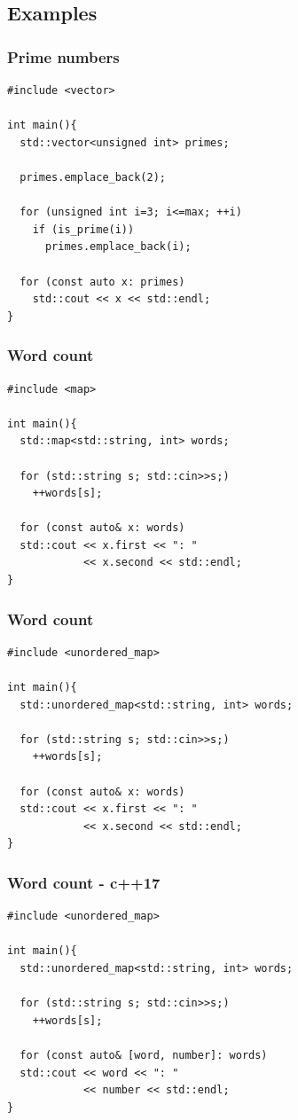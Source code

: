 \subsection{Examples}
\begin{frame}[fragile]
  \frametitle{Prime numbers}
\begin{lstlisting}
#include <vector>

int main(){
  std::vector<unsigned int> primes;
  
  primes.emplace_back(2);

  for (unsigned int i=3; i<=max; ++i)
    if (is_prime(i))
      primes.emplace_back(i);

  for (const auto x: primes)
    std::cout << x << std::endl;
}
\end{lstlisting}
\end{frame}

\begin{frame}[fragile]
  \frametitle{Word count}
\begin{lstlisting}
#include <map>
  
int main(){
  std::map<std::string, int> words;
  
  for (std::string s; std::cin>>s;)
    ++words[s];

  for (const auto& x: words)
  std::cout << x.first << ": "
            << x.second << std::endl;
}
\end{lstlisting}
\end{frame}

\begin{frame}[fragile]
  \frametitle{Word count}
\begin{lstlisting}
#include <unordered_map>
  
int main(){
  std::unordered_map<std::string, int> words;
  
  for (std::string s; std::cin>>s;)
    ++words[s];

  for (const auto& x: words)
  std::cout << x.first << ": "
            << x.second << std::endl;
}
\end{lstlisting}
\end{frame}

\begin{frame}[fragile]
  \frametitle{Word count - c++17}
\begin{lstlisting}
#include <unordered_map>
  
int main(){
  std::unordered_map<std::string, int> words;
  
  for (std::string s; std::cin>>s;)
    ++words[s];

  for (const auto& [word, number]: words)
  std::cout << word << ": "
            << number << std::endl;
}
\end{lstlisting}
\end{frame}
